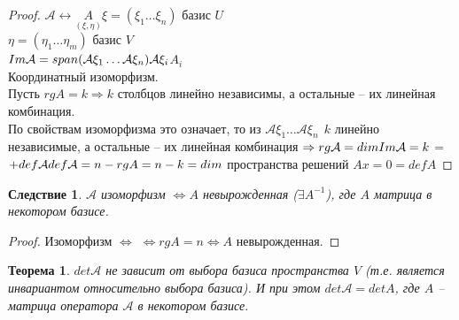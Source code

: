 \documentclass[12pt]{article}
\newtheorem{theorem}{Теорема}[subsection]
\newtheorem{corollary}{Следствие}[theorem]
\theoremstyle{remark}
\theoremstyle{definition}
\newcommand{\0}{\mathbb{0}}
\newcommand{\A}{\mathcal{A}}
\begin{document}
	\begin{proof}
		$\A\leftrightarrow\underset{(\xi, \eta)}{A} \xi = (\xi_1\ldots\xi_n)$ базис $U$\\
		$\eta = (\eta_1\ldots\eta_m)$ базис $V$\\
		$Im\A = span(\A\xi_1\ldots\A\xi_n)\\
		\A\xi_i$\stackanchor{$\leftrightarrow$}{$\cong$}$A_i$\\
		Координатный изоморфизм.\\
		Пусть $rgA = k \Rightarrow k$ столбцов линейно независимы, а остальные -- их линейная комбинация.\\
		По свойствам изоморфизма это означает, то из $\A\xi_1\ldots\A\xi_n \ \  k$ линейно независимые, а остальные -- их линейная комбинация $\Rightarrow rg\A = dimIm\A = k\\$
		 = \belowbaseline[-10pt]{
			$\begin{matrix}
				rg\A\\
				\parallel\\
				rgA\\
				\parallel\\
				k
			\end{matrix}$
		} $+ def\A\\
		def\A = n-rgA = n-k = dim$ пространства решений $Ax=0 = defA$ 
	\end{proof}
	\begin{corollary}
		$\A$ изоморфизм $\Leftrightarrow A$ невырожденная ($\exists A^{-1}$), где $A$ матрица в некотором базисе.
	\end{corollary}
	\begin{proof}
		Изоморфизм $\Leftrightarrow$  $\Leftrightarrow rgA = n \Leftrightarrow A$ невырожденная. 
	\end{proof}
	\begin{theorem}
		$det\A$ не зависит от выбора базиса пространства $V$ (т.е. является инвариантом относительно выбора базиса). И при этом $det\A = detA$, где $A$ -- матрица оператора $\A$ в некотором базисе.
	\end{theorem}
\end{document}
